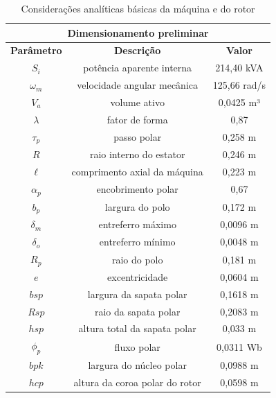 \documentclass[conference]{IEEEtran}
\begin{document}
\begin{table}[b]
\centering
\caption{Considerações analíticas básicas da máquina e do rotor}
\label{tab:base_rotor}
\begin{tabular}{|c|c|c|}
\hline
\multicolumn{3}{|c|}{\textbf{Dimensionamento preliminar}} \\ \hline
\textbf{Parâmetro} & \textbf{Descrição} & \textbf{Valor} \\ \hline
$S_i$ & potência aparente interna & 214,40 kVA \\ \hline
$\omega_m$ & velocidade angular mecânica & 125,66 rad/s \\ \hline
$V_a$ & volume ativo & 0,0425 m³ \\ \hline
$\lambda$ & fator de forma & 0,87 \\ \hline
$\tau_p$ & passo polar & 0,258 m \\ \hline
$R$ & raio interno do estator & 0,246 m \\ \hline
$\ell$ & comprimento axial da máquina & 0,223 m \\ \hline
$\alpha_p$ & encobrimento polar & 0,67 \\ \hline
$b_p$ & largura do polo & 0,172 m \\ \hline
$\delta_{m}$ & entreferro máximo & 0,0096 m \\ \hline
$\delta_o$ & entreferro mínimo  & 0,0048 m \\ \hline
$R_p$ & raio do polo & 0,181 m \\ \hline
$e$ & excentricidade & 0,0604 m \\ \hline
$bsp$ & largura da sapata polar & 0,1618 m \\ \hline
$Rsp$ & raio da sapata polar & 0,2083 m \\ \hline
$hsp$ & altura total da sapata polar & 0,033 m \\ \hline
$\phi_p$ & fluxo polar  & 0,0311 Wb \\ \hline
$bpk$ & largura do núcleo polar  & 0,0988 m \\ \hline
$hcp$ & altura da coroa polar do rotor & 0,0598 m \\ \hline
\end{tabular}
\end{table}
\end{document}
